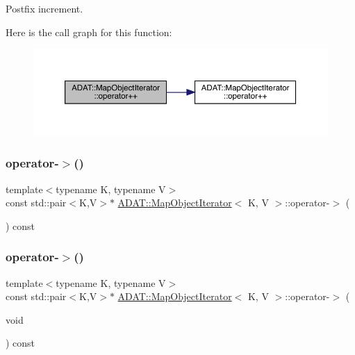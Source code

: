 Postfix increment. 

Here is the call graph for this function\+:
\nopagebreak
\begin{figure}[H]
\begin{center}
\leavevmode
\includegraphics[width=350pt]{d2/d4b/classADAT_1_1MapObjectIterator_a90809a5488988dd0d49ce25df35756ae_cgraph}
\end{center}
\end{figure}
\mbox{\label{classADAT_1_1MapObjectIterator_aa56a13020c9fac807f99312923610dbd}} 
\subsubsection{\texorpdfstring{operator-\/$>$()}{operator->()}\hspace{0.1cm}{\footnotesize\ttfamily [1/2]}}
{\footnotesize\ttfamily template$<$typename K, typename V$>$ \\
const std\+::pair$<$K,V$>$$\ast$ \mbox{\hyperlink{classADAT_1_1MapObjectIterator}{A\+D\+A\+T\+::\+Map\+Object\+Iterator}}$<$ K, V $>$\+::operator-\/$>$ (\begin{DoxyParamCaption}{ }\end{DoxyParamCaption}) const\hspace{0.3cm}{\ttfamily [inline]}}

\mbox{\label{classADAT_1_1MapObjectIterator_aa56a13020c9fac807f99312923610dbd}} 
\subsubsection{\texorpdfstring{operator-\/$>$()}{operator->()}\hspace{0.1cm}{\footnotesize\ttfamily [2/2]}}
{\footnotesize\ttfamily template$<$typename K, typename V$>$ \\
const std\+::pair$<$K,V$>$$\ast$ \mbox{\hyperlink{classADAT_1_1MapObjectIterator}{A\+D\+A\+T\+::\+Map\+Object\+Iterator}}$<$ K, V $>$\+::operator-\/$>$ (\begin{DoxyParamCaption}\item[{void}]{ }\end{DoxyParamCaption}) const\hspace{0.3cm}{\ttfamily [inline]}}

